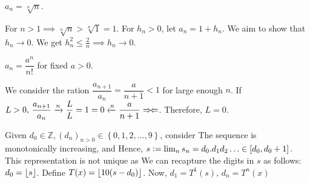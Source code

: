 \begin{example}
    $a_n=\sqrt[n]{n}$.
    
    For $n>1\implies \sqrt[n]{n}>\sqrt[n]{1}=1$. For $h_n>0$, let $a_n=1+h_n.$ We aim to show that $h_n\to0$.
    We get $h_n^2 \leq \frac{2}{n}\implies h_n\to0.$
\end{example}

\begin{example}
    $a_n=\dfrac{a^n}{n!}$ for fixed $a>0$.
    
    We consider the ration $\dfrac{a_{n+1}}{a_n} = \dfrac{a}{n+1}<1$ for large enough $n$.
    If $L>0,\,\dfrac{a_{n+1}}{a_n}\xrightarrow{n}\dfrac{L}{L}=1=0\xleftarrow{n}\dfrac{a}{n+1}\Rightarrow\!\Leftarrow$. Therefore, $L=0.$
\end{example}

\begin{example}
    Given $d_0\in\mathbb{Z},(d_n)_{n>0}\in\left\{0,1,2,\dotsc,9\right\}$, consider
    The sequence is monotonically increasing, and
    Hence, $s\mathrel{\mathop:}=\lim_n s_n = d_0.d_1d_2\dotso\in\left[d_0,d_0+1\right]$. This representation is not unique as
    We can recapture the digits in $s$ as follows: $d_0=\left\lfloor s \right\rfloor$. Define $T(x)=\left\lfloor 10(s-d_0) \right\rfloor$. Now, $d_1 = T^1(s),\, d_n = T^n(x)$
\end{example}

